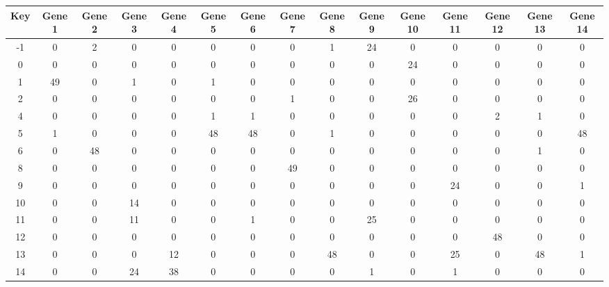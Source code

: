 \begin{tabular}{|c|c|c|c|c|c|c|c|c|c|c|c|c|c|c|}
\hline
Key & Gene 1 & Gene 2 & Gene 3 & Gene 4 & Gene 5 & Gene 6 & Gene 7 & Gene 8 & Gene 9 & Gene 10 & Gene 11 & Gene 12 & Gene 13 & Gene 14 \\
\hline
-1 & 0 & 2 & 0 & 0 & 0 & 0 & 0 & 1 & 24 & 0 & 0 & 0 & 0 & 0 \\
0 & 0 & 0 & 0 & 0 & 0 & 0 & 0 & 0 & 0 & 24 & 0 & 0 & 0 & 0 \\
1 & 49 & 0 & 1 & 0 & 1 & 0 & 0 & 0 & 0 & 0 & 0 & 0 & 0 & 0 \\
2 & 0 & 0 & 0 & 0 & 0 & 0 & 1 & 0 & 0 & 26 & 0 & 0 & 0 & 0 \\
4 & 0 & 0 & 0 & 0 & 1 & 1 & 0 & 0 & 0 & 0 & 0 & 2 & 1 & 0 \\
5 & 1 & 0 & 0 & 0 & 48 & 48 & 0 & 1 & 0 & 0 & 0 & 0 & 0 & 48 \\
6 & 0 & 48 & 0 & 0 & 0 & 0 & 0 & 0 & 0 & 0 & 0 & 0 & 1 & 0 \\
8 & 0 & 0 & 0 & 0 & 0 & 0 & 49 & 0 & 0 & 0 & 0 & 0 & 0 & 0 \\
9 & 0 & 0 & 0 & 0 & 0 & 0 & 0 & 0 & 0 & 0 & 24 & 0 & 0 & 1 \\
10 & 0 & 0 & 14 & 0 & 0 & 0 & 0 & 0 & 0 & 0 & 0 & 0 & 0 & 0 \\
11 & 0 & 0 & 11 & 0 & 0 & 1 & 0 & 0 & 25 & 0 & 0 & 0 & 0 & 0 \\
12 & 0 & 0 & 0 & 0 & 0 & 0 & 0 & 0 & 0 & 0 & 0 & 48 & 0 & 0 \\
13 & 0 & 0 & 0 & 12 & 0 & 0 & 0 & 48 & 0 & 0 & 25 & 0 & 48 & 1 \\
14 & 0 & 0 & 24 & 38 & 0 & 0 & 0 & 0 & 1 & 0 & 1 & 0 & 0 & 0 \\
\hline
\end{tabular}